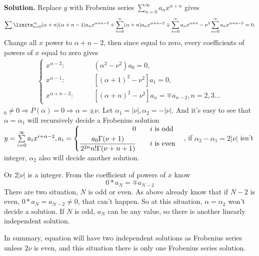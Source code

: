 \documentclass[a4paper]{book}
\newenvironment{solution}%
{\noindent\textbf{Solution.}}%
{\qedhere}
\numberwithin{equation}{chapter}
\theoremstyle{definition}
\begin{document}
\begin{solution}
  Replace $y$ with Frobenius series $\sum_{n=0}^\infty a_n x^{\alpha + n}$ gives
  \[\sum\linits_{n = 0}^{\infty} (\alpha + n)(\alpha + n - 1) a_n x^{\alpha + n - 2} + \sum\limits_{n=0}^\infty (\alpha + n) a_n x^{\alpha + n -2} \mp \sum\limits_{n=0}^\infty a_n x^{\alpha+n} - \nu^2 \sum\limits_{n=0}^\infty a_n x^{\alpha + n - 2} = 0.\]
  Change all $x$ power to $\alpha + n - 2$, then since equal to zero, every coefficients of powers of $x$ equal to zero gives
  \begin{align*}
    \begin{cases}
      x^{\alpha - 2}:\qquad & (\alpha^2 - \nu^2)a_0 = 0, \\
      x^{\alpha - 1}:\qquad & [(\alpha+1)^2 - \nu^2]a_1 = 0, \\
      x^{\alpha +n -2}: \qquad & [(\alpha+n)^2 - \nu^2]a_{n} = \mp a_{n-2},  n = 2,3\ldots  
    \end{cases}
  \end{align*}
  $_0 \not= 0 \Rightarrow P(\alpha) = 0 \Rightarrow \alpha = \pm \nu$. Let $\alpha_1 = \left| \nu \right|, \alpha_2 = -\left| \nu \right|$. And it's easy to see that $\alpha = \alpha_1$ will recursively decide a Frobenius solution $y = \sum\limits_{i = 0}^{\infty}a_i x^{i + \alpha - 2}, a_i =
  \begin{cases}
    \begin{aligned}
      0 \qquad  &i \textmd{ is odd} \\
      \frac{a_0\Gamma(\nu + 1)}{2^{2n} n! \Gamma(\nu + n + 1)}\qquad & i \textmd{ is even}
    \end{aligned}
  \end{cases}
  $, if $\alpha_2 - \alpha_1 = 2\left| \nu \right|$ isn't integer, $\alpha_2$ also will decide another solution.

  Or $2\left| \nu \right|$ is a integer. From the coefficient of powers of $x$ know
  \[0 * a_N = \mp a_{N-2}\]
  There are two situation, $N$ is odd or even. As above already know that if $N-2$ is even, $ 0* a_N = a_{N-2} \not= 0$, that can't happen. So at this situation, $\alpha = \alpha_2$ won't decide a solution. If $N$ is odd, $a_N$ can be any value, so there is another linearly independent solution.

  In summary, equation will have two independent solutions as Frobenius series unless $2\nu$ is even, and this situation there is only one Frobenius series solution.

\end{solution}
\end{document}
